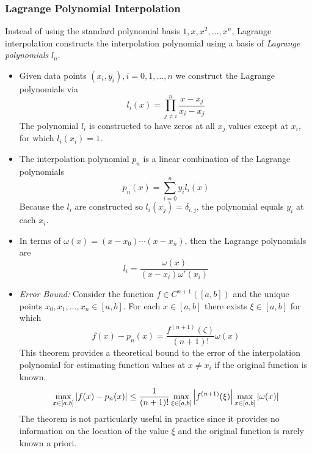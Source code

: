 \documentclass[11pt, a4paper]{article}
\begin{document}
\subsubsection{Lagrange Polynomial Interpolation}
Instead of using the standard polynomial basis $ 1, x, x^{2}, \ldots, x^{n} $, Lagrange interpolation constructs the interpolation polynomial using a basis of \textit{Lagrange polynomials} $ l_{n} $.
\begin{itemize}
	\item Given data points $ (x_i, y_{i}), i = 0, 1, \dots, n $ we construct the Lagrange polynomials via
	\begin{equation*}
		l_{i}(x) = \prod_{j \neq i}^{n}\frac{x - x_j}{x_i - x_j}
	\end{equation*}
	The polynomial $ l_{i} $ is constructed to have zeros at all $ x_j $ values except at $ x_i $, for which $ l_{i}(x_{i}) = 1 $.
	
	\item The interpolation polynomial $ p_{n} $ is a linear combination of the Lagrange polynomials
	\begin{equation*}
		p_n(x) = \sum_{i=0}^{n}y_i l_{i}(x)
	\end{equation*}
	Because the $ l_{i} $ are constructed so $ l_{i}(x_{j}) = \delta_{i, j}$, the polynomial equals $ y_{i} $ at each $ x_{i} $.
	
	\item In terms of $ \omega(x) = (x - x_0)\cdots(x- x_n)$, then the Lagrange polynomials are
	\begin{equation*}
		l_{i} = \frac{\omega(x)}{(x-x_i)\omega'(x_i)}
	\end{equation*}
	
	\item \textit{Error Bound:} Consider the function $ f \in C^{n+1}([a, b]) $ and the unique points $ x_{0}, x_{1}, \ldots, x_{n} \in [a, b] $. For each $ x \in [a, b] $ there exists $ \xi \in [a, b] $ for which
	\begin{equation*}
		f(x) - p_n(x) = \frac{f^{(n+1)}(\zeta)}{(n+1)!}\omega(x)
	\end{equation*}
	This theorem provides a theoretical bound to the error of the interpolation polynomial for estimating function values at $ x \neq x_{i}$ if the original function is known.
	\begin{equation*}
	 \max_{x\in [a,b]} \abs{f(x) - p_{n}(x)} \leq \frac{1}{(n+1)!} \max_{\xi \in [a,b]} \abs{f^{(n+1)}(\xi)} \max_{x \in [a,b]} \abs{\omega(x)}
	\end{equation*}
	 The theorem is not particularly useful in practice since it provides no information on the location of the value $ \xi $ and the original function is rarely known a priori.
	 
\end{itemize}
\end{document}
